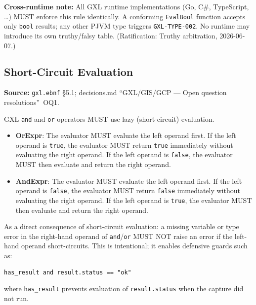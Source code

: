 \noindent\textbf{Cross-runtime note:}
All GXL runtime implementations (Go, C\#, TypeScript, \ldots) MUST
enforce this rule identically.  A conforming \texttt{EvalBool} function
accepts only \texttt{bool} results; any other PJVM type triggers
\texttt{GXL-TYPE-002}.  No runtime may introduce its own truthy/falsy
table.
(Ratification: Truthy arbitration, 2026-06-07.)

\subsection{Short-Circuit Evaluation}
\label{sec:gxl:semantics:short-circuit}

\noindent\textbf{Source:} \texttt{gxl.ebnf} \S5.1;
decisions.md ``GXL/GIS/GCP --- Open question resolutions''~OQ1.

GXL \texttt{and} and \texttt{or} operators MUST use lazy (short-circuit)
evaluation.

\begin{itemize}
  \item \textbf{OrExpr}: The evaluator MUST evaluate the left operand first.
    If the left operand is \texttt{true}, the evaluator MUST return
    \texttt{true} immediately without evaluating the right operand.
    If the left operand is \texttt{false}, the evaluator MUST then evaluate
    and return the right operand.

  \item \textbf{AndExpr}: The evaluator MUST evaluate the left operand first.
    If the left operand is \texttt{false}, the evaluator MUST return
    \texttt{false} immediately without evaluating the right operand.
    If the left operand is \texttt{true}, the evaluator MUST then evaluate
    and return the right operand.
\end{itemize}

As a direct consequence of short-circuit evaluation: a missing variable or
type error in the right-hand operand of \texttt{and}/\texttt{or} MUST NOT
raise an error if the left-hand operand short-circuits.
This is intentional; it enables defensive guards such as:

\begin{verbatim}
has_result and result.status == "ok"
\end{verbatim}

\noindent where \texttt{has\_result} prevents evaluation of
\texttt{result.status} when the capture did not run.

